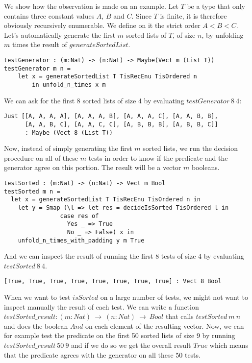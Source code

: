 We show how the observation is made on an example. Let $T$ be a type that only contains three constant values $A$, $B$ and $C$. Since $T$ is finite, it is therefore obviously recursively enumerable. We define on it the strict order $A < B < C$.
Let's automatically generate the first $m$ sorted lists of $T$, of size $n$, by unfolding $m$ times the result of $generateSortedList$.


\begin{lstlisting}
testGenerator : (m:Nat) -> (n:Nat) -> Maybe(Vect m (List T))
testGenerator m n = 
	let x = generateSortedList T TisRecEnu TisOrdered n 
	    in unfold_n_times x m
\end{lstlisting}
We can ask for the first 8 sorted lists of size 4 by evaluating $testGenerator\ 8\ 4$:

\begin{lstlisting}
Just [[A, A, A, A], [A, A, A, B], [A, A, A, C], [A, A, B, B],
      [A, A, B, C], [A, A, C, C], [A, B, B, B], [A, B, B, C]] 
      : Maybe (Vect 8 (List T))
\end{lstlisting}
Now, instead of simply generating the first $m$ sorted lists, we run the decision procedure on all of these $m$ tests in order to know if the predicate and the generator agree on this portion. The result will be a vector $m$ booleans.

\begin{lstlisting}
testSorted : (m:Nat) -> (n:Nat) -> Vect m Bool
testSorted m n = 
  let x = generateSortedList T TisRecEnu TisOrdered n in
    let y = Smap (\l => let res = decideIsSorted TisOrdered l in
			    case res of
			      Yes _ => True
			      No _ => False) x in
	unfold_n_times_with_padding y m True
\end{lstlisting}
And we can inspect the result of running the first 8 tests of size 4 by evaluating $testSorted\ 8\ 4$.

\begin{lstlisting}
[True, True, True, True, True, True, True, True] : Vect 8 Bool
\end{lstlisting}


When we want to test $isSorted$ on a large number of tests, we might not want to inspect manually the result of each test. We can write a function $testSorted\_result : (m:Nat)\ \rightarrow\ (n:Nat)\ \rightarrow\ Bool$ that calls $testSorted\ m\ n$ and does the boolean $And$ on each element of the resulting vector. Now, we can for example test the predicate on the first 50 sorted lists of size 9 by running $testSorted\_result\ 50\ 9$ and if we do so we get the overall result $True$ which means that the predicate agrees with the generator on all these 50 tests.

